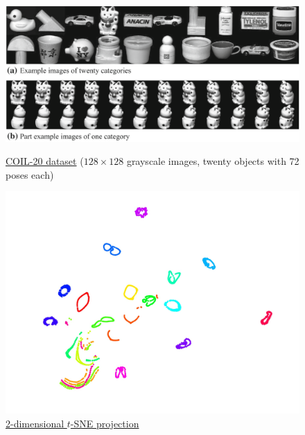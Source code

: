 \documentclass[11pt, a4paper]{amsart}
\begin{document}
\begin{figure}[ht]
	\begin{minipage}[b]{0.55\linewidth}
		\centering
		\includegraphics[width=1.0\linewidth]{figures/topological_data_analysis/coil_20_adaptive_graph_embedding_discriminant_projections}
		\caption{
			\href{https://www.cs.columbia.edu/CAVE/software/softlib/coil-20.php}{COIL-20 dataset}
			($128 \times 128$ grayscale images, twenty objects with 72 poses each)
		}
		\label{fig:coil_20}
	\end{minipage}
	\hfill
	\begin{minipage}[b]{0.4\linewidth}
		\centering
		\includegraphics[width=1.0\linewidth]{figures/topological_data_analysis/coil_20_tsne_van_der_maaten}
		\caption{
			\href{https://lvdmaaten.github.io/tsne/}{2-dimensional $t$-SNE projection}
		}
		\label{fig:coil_20_tsne}
	\end{minipage}
\end{figure}
\end{document}
